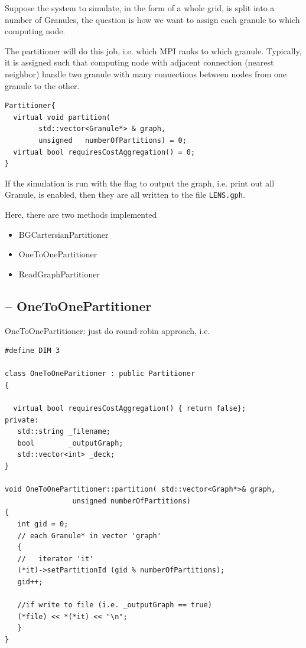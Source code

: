 Suppose the system to simulate, in the form of a whole grid, is split into a
number of Granules, the question is how we want to assign each granule to which
computing node.

The partitioner will do this job, i.e. which MPI ranks to which granule.
Typically, it is assigned such that computing node with adjacent connection
(nearest neighbor) handle two granule with many connections between nodes from
one granule to the other.
\begin{verbatim}
Partitioner{
  virtual void partition( 
        std::vector<Granule*> & graph,
        unsigned   numberOfPartitions) = 0;
  virtual bool requiresCostAggregation() = 0;
}
\end{verbatim}

If the simulation is run with the flag to output the graph, i.e. print out all
Granule, is enabled, then they are all written to the file \verb!LENS.gph!.

Here, there are two methods implemented
\begin{itemize}
  \item BGCartersianPartitioner
  
  \item OneToOnePartitioner
  
  \item ReadGraphPartitioner
\end{itemize}

\subsection{-- OneToOnePartitioner}
\label{sec:OneToOnePartitioner}

OneToOnePartitioner: just do round-robin approach, i.e. 

\begin{lstlisting}
#define DIM 3

class OneToOneParitioner : public Partitioner
{

  virtual bool requiresCostAggregation() { return false};
private:
   std::string _filename;
   bool        _outputGraph;
   std::vector<int> _deck;
}

void OneToOnePartitioner::partition( std::vector<Graph*>& graph,
                unsigned numberOfPartitions)               
{
   int gid = 0; 
   // each Granule* in vector 'graph'
   {
   //   iterator 'it'
   (*it)->setPartitionId (gid % numberOfPartitions);
   gid++;
   
   //if write to file (i.e. _outputGraph == true)
   (*file) << *(*it) << "\n";
   }
}
\end{lstlisting}

